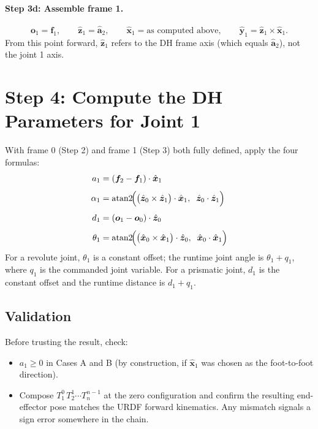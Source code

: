 \documentclass[11pt]{article}
\newcommand{\vect}[1]{\bm{#1}}
\newcommand{\unit}[1]{\hat{\bm{#1}}}
\newcommand{\atantwo}{\operatorname{atan2}}
\begin{document}
\paragraph{Step 3d: Assemble frame 1.}
\[
  \vect{o}_1 = \vect{f}_1, \qquad
  \unit{z}_1 = \unit{a}_2, \qquad
  \unit{x}_1 = \text{as computed above}, \qquad
  \unit{y}_1 = \unit{z}_1 \times \unit{x}_1.
\]
From this point forward, $\unit{z}_1$ refers to the DH frame axis (which
equals $\unit{a}_2$), not the joint 1 axis.

\section{Step 4: Compute the DH Parameters for Joint 1}

With frame 0 (Step 2) and frame 1 (Step 3) both fully defined, apply the
four formulas:
\begin{align}
  a_1      &= (\vect{f}_2 - \vect{f}_1) \cdot \unit{x}_1 \\[4pt]
  \alpha_1 &= \atantwo\!\Bigl(\bigl(\unit{z}_0 \times \unit{z}_1\bigr) \cdot \unit{x}_1,\;\;
                               \unit{z}_0 \cdot \unit{z}_1\Bigr) \\[4pt]
  d_1      &= (\vect{o}_1 - \vect{o}_0) \cdot \unit{z}_0 \\[4pt]
  \theta_1 &= \atantwo\!\Bigl(\bigl(\unit{x}_0 \times \unit{x}_1\bigr) \cdot \unit{z}_0,\;\;
                               \unit{x}_0 \cdot \unit{x}_1\Bigr)
\end{align}
For a revolute joint, $\theta_1$ is a constant offset; the runtime joint
angle is $\theta_1 + q_1$, where $q_1$ is the commanded joint variable. For
a prismatic joint, $d_1$ is the constant offset and the runtime distance is
$d_1 + q_1$.

\subsection*{Validation}

Before trusting the result, check:
\begin{itemize}
  \item $a_1 \ge 0$ in Cases A and B (by construction, if $\unit{x}_1$ was
        chosen as the foot-to-foot direction).
  \item Compose $T_1^0 \, T_2^1 \cdots T_n^{n-1}$ at the zero configuration
        and confirm the resulting end-effector pose matches the URDF forward
        kinematics. Any mismatch signals a sign error somewhere in the chain.
\end{itemize}
\end{document}
